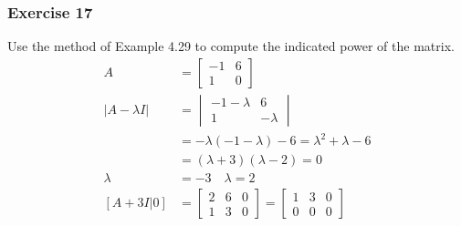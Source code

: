 \documentclass{math}
\begin{document}
\subsubsection*{Exercise 17}
Use the method of Example 4.29 to compute the indicated power of the matrix.
\begin{align*}
  A &= \begin{bmatrix}-1 & 6 \\ 1 & 0\end{bmatrix} \\
  |A-\lambda I| &= \begin{vmatrix}
    -1-\lambda & 6 \\
    1 & -\lambda
  \end{vmatrix} \\
  &= -\lambda(-1-\lambda)-6 = \lambda^2+\lambda-6 \\
  &= (\lambda+3)(\lambda-2) = 0 \\
  \lambda &= -3 \quad \lambda = 2 \\
  [A+3I|0] &= \begin{bmatrix}
    2 & 6 & 0 \\
    1 & 3 & 0
  \end{bmatrix} = \begin{bmatrix}
    1 & 3 & 0 \\
    0 & 0 & 0
  \end{bmatrix}
\end{align*}
\end{document}
